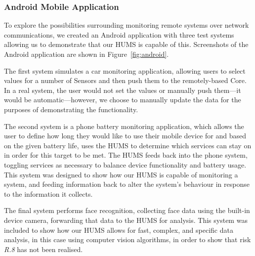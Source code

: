 \documentclass[10pt,a4paper]{article}
\begin{document}
\subsubsection{Android Mobile Application}
To explore the possibilities surrounding monitoring remote systems over network communications, we created an Android application with three test systems allowing us to demonstrate that our HUMS is capable of this. Screenshots of the Android application are shown in Figure~\ref{fig:android}.

The first system simulates a car monitoring application, allowing users to select values for a number of Sensors and then push them to the remotely-based Core. In a real system, the user would not set the values or manually push them---it would be automatic---however, we choose to manually update the data for the purposes of demonstrating the functionality.

The second system is a phone battery monitoring application, which allows the user to define how long they would like to use their mobile device for and based on the given battery life, uses the HUMS to determine which services can stay on in order for this target to be met. The HUMS feeds back into the phone system, toggling services as necessary to balance device functionality and battery usage. This system was designed to show how our HUMS is capable of monitoring a system, and feeding information back to alter the system's behaviour in response to the information it collects.

The final system performs face recognition, collecting face data using the built-in device camera, forwarding that data to the HUMS for analysis. This system was included to show how our HUMS allows for fast, complex, and specific data analysis, in this case using computer vision algorithms, in order to show that risk \emph{R.8} has not been realised. 
\end{document}
